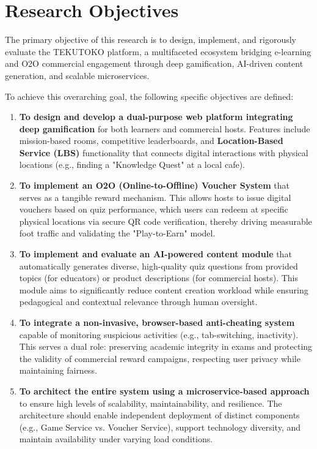 \section{Research Objectives}
\label{sec:intro_objectives}

The primary objective of this research is to design, implement, and rigorously evaluate the TEKUTOKO platform, a multifaceted ecosystem bridging e-learning and O2O commercial engagement through deep gamification, AI-driven content generation, and scalable microservices.

To achieve this overarching goal, the following specific objectives are defined:

\begin{enumerate}
    \item \textbf{To design and develop a dual-purpose web platform integrating deep gamification} for both learners and commercial hosts. Features include mission-based rooms, competitive leaderboards, and \textbf{Location-Based Service (LBS)} functionality that connects digital interactions with physical locations (e.g., finding a "Knowledge Quest" at a local cafe).
    
    \item \textbf{To implement an O2O (Online-to-Offline) Voucher System} that serves as a tangible reward mechanism. This allows hosts to issue digital vouchers based on quiz performance, which users can redeem at specific physical locations via secure QR code verification, thereby driving measurable foot traffic and validating the "Play-to-Earn" model.
    
    \item \textbf{To implement and evaluate an AI-powered content module} that automatically generates diverse, high-quality quiz questions from provided topics (for educators) or product descriptions (for commercial hosts). This module aims to significantly reduce content creation workload while ensuring pedagogical and contextual relevance through human oversight.
    
    \item \textbf{To integrate a non-invasive, browser-based anti-cheating system} capable of monitoring suspicious activities (e.g., tab-switching, inactivity). This serves a dual role: preserving academic integrity in exams and protecting the validity of commercial reward campaigns, respecting user privacy while maintaining fairness.
    
    \item \textbf{To architect the entire system using a microservice-based approach} to ensure high levels of scalability, maintainability, and resilience. The architecture should enable independent deployment of distinct components (e.g., Game Service vs. Voucher Service), support technology diversity, and maintain availability under varying load conditions.
    

\end{enumerate}
